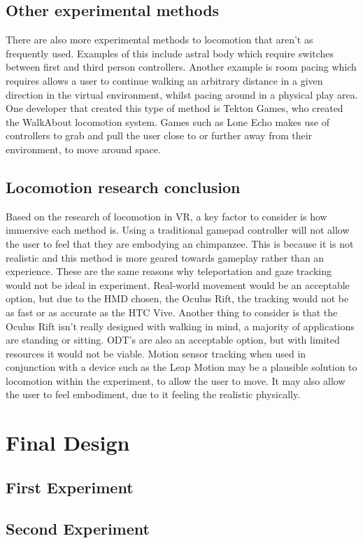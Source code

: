\documentclass[12pt]{report}
\begin{document}
\subsection{Other experimental methods}
There are also more experimental methods to locomotion that aren’t as frequently used. Examples of this include astral body which require switches between first and third person controllers. Another example is room pacing which requires allows a user to continue walking an arbitrary distance in a given direction in the virtual environment, whilst pacing around in a physical play area. One developer that created this type of method is Tekton Games, who created the WalkAbout  locomotion system. Games such as Lone Echo  makes use of controllers to grab and pull the user close to or further away from their environment, to move around space. 

\subsection{Locomotion research conclusion}
Based on the research of locomotion in VR, a key factor to consider is how immersive each method is. Using a traditional gamepad controller will not allow the user to feel that they are embodying an chimpanzee. This is because it is not realistic and this method is more geared towards gameplay rather than an experience. These are the same reasons why teleportation and gaze tracking would not be ideal in experiment. Real-world movement would be an acceptable option, but due to the HMD chosen, the Oculus Rift, the tracking would not be as fast or as accurate as the HTC Vive. Another thing to consider is that the Oculus Rift isn’t really designed with walking in mind, a majority of applications are standing or sitting. ODT’s are also an acceptable option, but with limited resources it would not be viable. Motion sensor tracking when used in conjunction with a device such as the Leap Motion may be a plausible solution to locomotion within the experiment, to allow the user to move. It may also allow the user to feel embodiment, due to it feeling the realistic physically.

 
\section{Final Design}
\subsection{First Experiment}
\subsection{Second Experiment}
\end{document}
